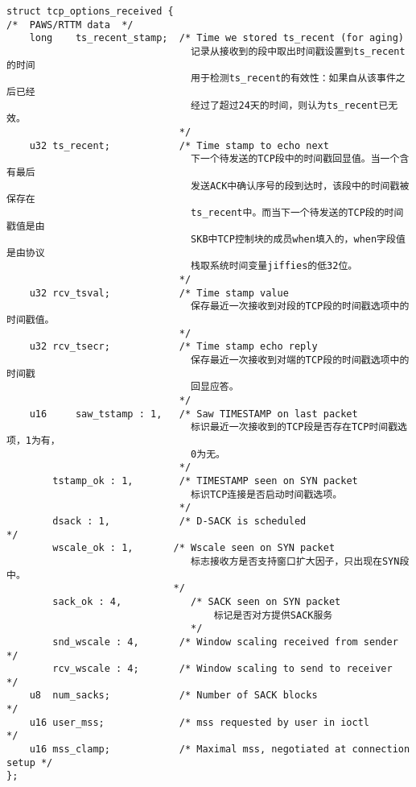 \begin{verbatim}
struct tcp_options_received {
/*  PAWS/RTTM data  */
    long    ts_recent_stamp;  /* Time we stored ts_recent (for aging)        
                                记录从接收到的段中取出时间戳设置到ts_recent的时间
                                用于检测ts_recent的有效性：如果自从该事件之后已经
                                经过了超过24天的时间，则认为ts_recent已无效。
                              */
    u32 ts_recent;            /* Time stamp to echo next                     
                                下一个待发送的TCP段中的时间戳回显值。当一个含有最后
                                发送ACK中确认序号的段到达时，该段中的时间戳被保存在
                                ts_recent中。而当下一个待发送的TCP段的时间戳值是由
                                SKB中TCP控制块的成员when填入的，when字段值是由协议
                                栈取系统时间变量jiffies的低32位。
                              */
    u32 rcv_tsval;            /* Time stamp value                            
                                保存最近一次接收到对段的TCP段的时间戳选项中的时间戳值。
                              */
    u32 rcv_tsecr;            /* Time stamp echo reply                       
                                保存最近一次接收到对端的TCP段的时间戳选项中的时间戳
                                回显应答。
                              */
    u16     saw_tstamp : 1,   /* Saw TIMESTAMP on last packet                
                                标识最近一次接收到的TCP段是否存在TCP时间戳选项，1为有，
                                0为无。
                              */
        tstamp_ok : 1,        /* TIMESTAMP seen on SYN packet                
                                标识TCP连接是否启动时间戳选项。
                              */
        dsack : 1,            /* D-SACK is scheduled                         */
        wscale_ok : 1,       /* Wscale seen on SYN packet                   
                                标志接收方是否支持窗口扩大因子，只出现在SYN段中。   
                             */
        sack_ok : 4,            /* SACK seen on SYN packet                     
                                    标记是否对方提供SACK服务
                                */
        snd_wscale : 4,       /* Window scaling received from sender         */
        rcv_wscale : 4;       /* Window scaling to send to receiver          */
    u8  num_sacks;            /* Number of SACK blocks                       */
    u16 user_mss;             /* mss requested by user in ioctl              */
    u16 mss_clamp;            /* Maximal mss, negotiated at connection setup */
};
\end{verbatim}            
